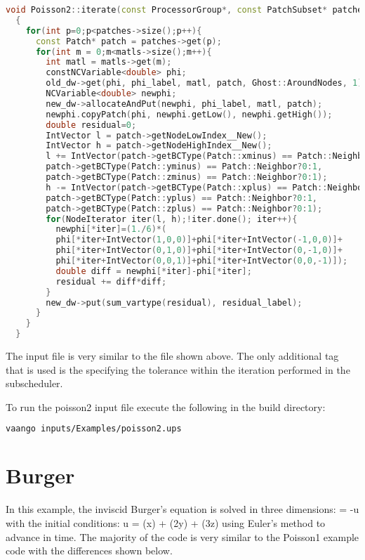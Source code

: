 \begin{lstlisting}[language=Cpp]
  void Poisson2::iterate(const ProcessorGroup*, const PatchSubset* patches, const MaterialSubset* matls, DataWarehouse* old_dw, DataWarehouse* new_dw)
  {
    for(int p=0;p<patches->size();p++){
      const Patch* patch = patches->get(p);
      for(int m = 0;m<matls->size();m++){
        int matl = matls->get(m);
        constNCVariable<double> phi;
        old_dw->get(phi, phi_label, matl, patch, Ghost::AroundNodes, 1);
        NCVariable<double> newphi;
        new_dw->allocateAndPut(newphi, phi_label, matl, patch);
        newphi.copyPatch(phi, newphi.getLow(), newphi.getHigh());
        double residual=0;
        IntVector l = patch->getNodeLowIndex__New();
        IntVector h = patch->getNodeHighIndex__New(); 
        l += IntVector(patch->getBCType(Patch::xminus) == Patch::Neighbor?0:1,
        patch->getBCType(Patch::yminus) == Patch::Neighbor?0:1,
        patch->getBCType(Patch::zminus) == Patch::Neighbor?0:1);
        h -= IntVector(patch->getBCType(Patch::xplus) == Patch::Neighbor?0:1,
        patch->getBCType(Patch::yplus) == Patch::Neighbor?0:1,
        patch->getBCType(Patch::zplus) == Patch::Neighbor?0:1);
        for(NodeIterator iter(l, h);!iter.done(); iter++){
          newphi[*iter]=(1./6)*(
          phi[*iter+IntVector(1,0,0)]+phi[*iter+IntVector(-1,0,0)]+
          phi[*iter+IntVector(0,1,0)]+phi[*iter+IntVector(0,-1,0)]+
          phi[*iter+IntVector(0,0,1)]+phi[*iter+IntVector(0,0,-1)]);
          double diff = newphi[*iter]-phi[*iter];
          residual += diff*diff;
        }
        new_dw->put(sum_vartype(residual), residual_label);
      }
    }
  }
\end{lstlisting}

The input file
is very similar to the  file shown above.  The only
additional tag that is used is the  specifying
the tolerance within the iteration performed in the subscheduler.

To run the poisson2 input file execute the following in the  build
 directory:

\begin{lstlisting}[language=sh,backgroundcolor=\color{background}]
  vaango inputs/Examples/poisson2.ups
\end{lstlisting}


\section{Burger}
In this example, the inviscid Burger's equation is solved in three dimensions:
\Beq
   = -u   
\Eeq
with the initial conditions:
\Beq
  u = \sin(\pi x) + \sin(2\pi y) + \sin(3\pi z)
\Eeq
using Euler's method to advance in time.  The majority of the code is
very similar to the Poisson1 example code with the differences shown
below.

